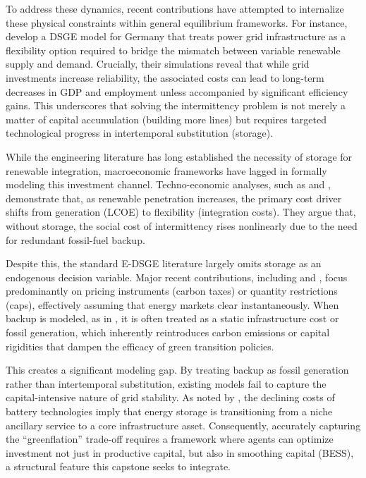 \documentclass[12pt, a4paper]{article}
\begin{document}
To address these dynamics, recent contributions have attempted to internalize these physical constraints within general equilibrium frameworks. For instance, \citet{schreiner2020investing} develop a DSGE model for Germany that treats power grid infrastructure as a flexibility option required to bridge the mismatch between variable renewable supply and demand. Crucially, their simulations reveal that while grid investments increase reliability, the associated costs can lead to long-term decreases in GDP and employment unless accompanied by significant efficiency gains. This underscores that solving the intermittency problem is not merely a matter of capital accumulation (building more lines) but requires targeted technological progress in intertemporal substitution (storage).

While the engineering literature has long established the necessity of storage for renewable integration, macroeconomic frameworks have lagged in formally modeling this investment channel. Techno-economic analyses, such as \citet{zakeri2015} and \citet{lund2015}, demonstrate that, as renewable penetration increases, the primary cost driver shifts from generation (LCOE) to flexibility (integration costs). They argue that, without storage, the social cost of intermittency rises nonlinearly due to the need for redundant fossil-fuel backup.

Despite this, the standard E-DSGE literature largely omits storage as an endogenous decision variable. Major recent contributions, including \citet{batten2020} and \citet{annicchiarico2021}, focus predominantly on pricing instruments (carbon taxes) or quantity restrictions (caps), effectively assuming that energy markets clear instantaneously. When backup is modeled, as in \citet{schreiner2020investing}, it is often treated as a static infrastructure cost or fossil generation, which inherently reintroduces carbon emissions or capital rigidities that dampen the efficacy of green transition policies.

This creates a significant modeling gap. By treating backup as fossil generation rather than intertemporal substitution, existing models fail to capture the capital-intensive nature of grid stability. As noted by \citet{kittner2017}, the declining costs of battery technologies imply that energy storage is transitioning from a niche ancillary service to a core infrastructure asset. Consequently, accurately capturing the ``greenflation'' trade-off requires a framework where agents can optimize investment not just in productive capital, but also in smoothing capital (BESS), a structural feature this capstone seeks to integrate.
\end{document}
